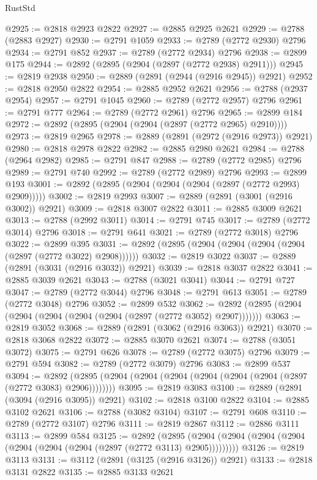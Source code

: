 \begin{lexlean}{RustStd}
\begin{coremodule}
@2925 := @2818 @2923 @2822
@2927 := @2885 @2925 @2621
@2929 := @2788 (@2883 @2927)
@2930 := @2791 @1059
@2933 := @2789 (@2772 @2930) @2796
@2934 := @2791 @852
@2937 := @2789 (@2772 @2934) @2796
@2938 := @2899 @175
@2944 := @2892 (@2895 (@2904 (@2897 (@2772 @2938) @2911)))
@2945 := @2819 @2938
@2950 := @2889 (@2891 (@2944 (@2916 @2945)) @2921)
@2952 := @2818 @2950 @2822
@2954 := @2885 @2952 @2621
@2956 := @2788 (@2937 @2954)
@2957 := @2791 @1045
@2960 := @2789 (@2772 @2957) @2796
@2961 := @2791 @777
@2964 := @2789 (@2772 @2961) @2796
@2965 := @2899 @184
@2972 := @2892 (@2895 (@2904 (@2904 (@2897 (@2772 @2965) @2910))))
@2973 := @2819 @2965
@2978 := @2889 (@2891 (@2972 (@2916 @2973)) @2921)
@2980 := @2818 @2978 @2822
@2982 := @2885 @2980 @2621
@2984 := @2788 (@2964 @2982)
@2985 := @2791 @847
@2988 := @2789 (@2772 @2985) @2796
@2989 := @2791 @740
@2992 := @2789 (@2772 @2989) @2796
@2993 := @2899 @193
@3001 := @2892 (@2895 (@2904 (@2904 (@2904 (@2897 (@2772 @2993) @2909)))))
@3002 := @2819 @2993
@3007 := @2889 (@2891 (@3001 (@2916 @3002)) @2921)
@3009 := @2818 @3007 @2822
@3011 := @2885 @3009 @2621
@3013 := @2788 (@2992 @3011)
@3014 := @2791 @745
@3017 := @2789 (@2772 @3014) @2796
@3018 := @2791 @641
@3021 := @2789 (@2772 @3018) @2796
@3022 := @2899 @395
@3031 := @2892 (@2895 (@2904 (@2904 (@2904 (@2904 (@2897 (@2772 @3022) @2908))))))
@3032 := @2819 @3022
@3037 := @2889 (@2891 (@3031 (@2916 @3032)) @2921)
@3039 := @2818 @3037 @2822
@3041 := @2885 @3039 @2621
@3043 := @2788 (@3021 @3041)
@3044 := @2791 @727
@3047 := @2789 (@2772 @3044) @2796
@3048 := @2791 @613
@3051 := @2789 (@2772 @3048) @2796
@3052 := @2899 @532
@3062 := @2892 (@2895 (@2904 (@2904 (@2904 (@2904 (@2904 (@2897 (@2772 @3052) @2907)))))))
@3063 := @2819 @3052
@3068 := @2889 (@2891 (@3062 (@2916 @3063)) @2921)
@3070 := @2818 @3068 @2822
@3072 := @2885 @3070 @2621
@3074 := @2788 (@3051 @3072)
@3075 := @2791 @626
@3078 := @2789 (@2772 @3075) @2796
@3079 := @2791 @594
@3082 := @2789 (@2772 @3079) @2796
@3083 := @2899 @537
@3094 := @2892 (@2895 (@2904 (@2904 (@2904 (@2904 (@2904 (@2904 (@2897 (@2772 @3083) @2906))))))))
@3095 := @2819 @3083
@3100 := @2889 (@2891 (@3094 (@2916 @3095)) @2921)
@3102 := @2818 @3100 @2822
@3104 := @2885 @3102 @2621
@3106 := @2788 (@3082 @3104)
@3107 := @2791 @608
@3110 := @2789 (@2772 @3107) @2796
@3111 := @2819 @2867
@3112 := @2886 @3111
@3113 := @2899 @584
@3125 := @2892
    (@2895 (@2904 (@2904 (@2904 (@2904 (@2904 (@2904 (@2904 (@2897 (@2772 @3113) @2905)))))))))
@3126 := @2819 @3113
@3131 := @3112 (@2891 (@3125 (@2916 @3126)) @2921)
@3133 := @2818 @3131 @2822
@3135 := @2885 @3133 @2621

\end{coremodule}
\end{lexlean}
